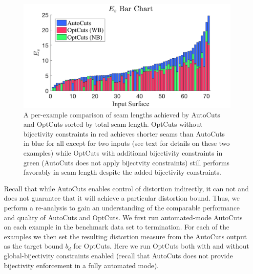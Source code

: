 \begin{figure}[t]
\centering
\includegraphics[width=\linewidth]{fig/ESLBar_compAutoCuts.png}
\vspace{-0.5cm}
\caption{
A per-example comparison of seam lengths achieved by 
AutoCuts and OptCuts sorted by total seam length. OptCuts without bijectivity constraints in red achieves shorter seams than AutoCuts in blue for all except for two inputs (see text for details on these two examples) while OptCuts with additional bijectivity constraints in green (AutoCuts does not apply bijectvity constraints) still performs favorably in seam length despite the added bijectivity constraints.
%
}
\label{fig:ESLBar_compAutoCuts}
\end{figure}


Recall that while AutoCuts enables control of distortion indirectly, it can not and does not guarantee that it will achieve a particular distortion bound. Thus, we perform a re-analysis to gain an understanding of the comparable performance and quality of AutoCuts and OptCuts. We first run automated-mode AutoCuts on each example in the benchmark data set to termination. For each of the examples we then set the resulting distortion measure from the AutoCuts output as the target bound $b_d$ for OptCuts. Here we run OptCuts both with and without global-bijectivity constraints enabled (recall that AutoCuts does not provide bijectivity enforcement in a fully automated mode). 


